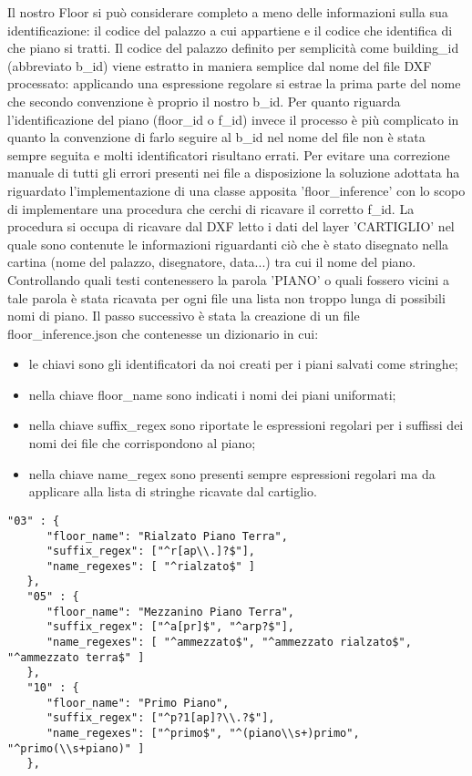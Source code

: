 \documentclass[12pt]{report}
\begin{document}
Il nostro Floor si può considerare completo a meno delle informazioni sulla sua identificazione: il codice del palazzo a cui appartiene e il codice che identifica di che piano si tratti. 
Il codice del palazzo definito per semplicità come building\_id (abbreviato b\_id) viene estratto in maniera semplice dal nome del file DXF processato: applicando una espressione regolare si estrae la prima parte del nome che secondo convenzione è proprio il nostro b\_id. 
Per quanto riguarda l'identificazione del piano (floor\_id o f\_id) invece il processo è più complicato in quanto la convenzione di farlo seguire al b\_id nel nome del file non è stata sempre seguita e molti identificatori risultano errati. 
Per evitare una correzione manuale di tutti gli errori presenti nei file a disposizione la soluzione adottata ha riguardato l'implementazione di una classe apposita 'floor\_inference' con lo scopo di implementare una procedura che cerchi di ricavare il corretto f\_id.
La procedura si occupa di ricavare dal DXF letto i dati del layer 'CARTIGLIO' nel quale sono contenute le informazioni riguardanti ciò che è stato disegnato nella cartina (nome del palazzo, disegnatore, data...) tra cui il nome del piano.
Controllando quali testi contenessero la parola 'PIANO' o quali fossero vicini a tale parola è stata ricavata per ogni file una lista non troppo lunga di possibili nomi di piano.  
Il passo successivo è stata la creazione di un file floor\_inference.json che contenesse un dizionario in cui:
\begin{itemize}
\item le chiavi sono gli identificatori da noi creati per i piani salvati come stringhe;
\item nella chiave floor\_name sono indicati i nomi dei piani uniformati;
\item nella chiave suffix\_regex sono riportate le espressioni regolari per i suffissi dei nomi dei file che corrispondono al piano;
\item nella chiave name\_regex sono presenti sempre espressioni regolari ma da applicare alla lista di stringhe ricavate dal cartiglio.
\end{itemize}

\begin{lstlisting}[label=codice,caption=Esempio del dizionario in floor\_inference.json, frame=single]
"03" : {
      "floor_name": "Rialzato Piano Terra",
      "suffix_regex": ["^r[ap\\.]?$"],
      "name_regexes": [ "^rialzato$" ]
   },
   "05" : {
      "floor_name": "Mezzanino Piano Terra",
      "suffix_regex": ["^a[pr]$", "^arp?$"],
      "name_regexes": [ "^ammezzato$", "^ammezzato rialzato$", "^ammezzato terra$" ]
   },
   "10" : {
      "floor_name": "Primo Piano",
      "suffix_regex": ["^p?1[ap]?\\.?$"],
      "name_regexes": ["^primo$", "^(piano\\s+)primo", "^primo(\\s+piano)" ]
   },
\end{lstlisting}
\end{document}
